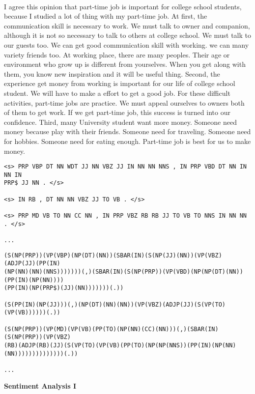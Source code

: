 \documentclass[11pt]{article}
\begin{document}
~\\
I agree this opinion that part-time job is important for college school
students, because I studied a lot of thing with my part-time job.   At first,
the communication skill is necessary to work. We must talk to owner and
companion, although it is not so necessary to talk to others at college
school. We must talk to our guests too. We can get good communication skill
with working. we can many variety friends too. At working place, there are
many peoples. Their age or environment who grow up is different from
yourselves. When you get along with them, you know new inspiration and it will
be useful thing.  Second, the experience get money from working is important
for our life of college school student. We will have to make a effort to get a
good job. For these difficult activities, part-time jobs are practice. We must
appeal ourselves to owners both of them to get work. If we get part-time job,
this success is turned into our confidence.  Third, many University student
want more money. Someone need money because play with their friends. Someone
need for traveling. Someone need for hobbies. Someone need for eating enough.
Part-time job is best for us to make money.

\begin{verbatim}
<s> PRP VBP DT NN WDT JJ NN VBZ JJ IN NN NN NNS , IN PRP VBD DT NN IN NN IN
PRP$ JJ NN . </s>

<s> IN RB , DT NN NN VBZ JJ TO VB . </s>

<s> PRP MD VB TO NN CC NN , IN PRP VBZ RB RB JJ TO VB TO NNS IN NN NN . </s>

...
\end{verbatim}

\begin{verbatim}
(S(NP(PRP))(VP(VBP)(NP(DT)(NN))(SBAR(IN)(S(NP(JJ)(NN))(VP(VBZ)(ADJP(JJ)(PP(IN)
(NP(NN)(NN)(NNS)))))))(,)(SBAR(IN)(S(NP(PRP))(VP(VBD)(NP(NP(DT)(NN))(PP(IN)(NP(NN))))
(PP(IN)(NP(PRP$)(JJ)(NN)))))))(.))

(S(PP(IN)(NP(JJ)))(,)(NP(DT)(NN)(NN))(VP(VBZ)(ADJP(JJ)(S(VP(TO)(VP(VB))))))(.))

(S(NP(PRP))(VP(MD)(VP(VB)(PP(TO)(NP(NN)(CC)(NN)))(,)(SBAR(IN)(S(NP(PRP))(VP(VBZ)
(RB)(ADJP(RB)(JJ)(S(VP(TO)(VP(VB)(PP(TO)(NP(NP(NNS))(PP(IN)(NP(NN)(NN))))))))))))))(.))

...
\end{verbatim}

\newpage

\textbf{Sentiment Analysis I}
\end{document}
